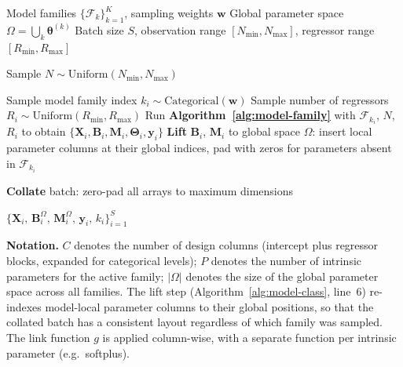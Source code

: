 \documentclass{article}
\begin{document}
\bigskip

\begin{algorithm}[H]
\caption{Model Class Meta-Simulator}
\label{alg:model-class}
\begin{algorithmic}[1]
\Require Model families $\{\mathcal{F}_k\}_{k=1}^{K}$, sampling weights $\mathbf{w}$
\Require Global parameter space $\Omega = \bigcup_k \boldsymbol{\theta}^{(k)}$
\Require Batch size $S$, observation range $[N_{\min}, N_{\max}]$, regressor range $[R_{\min}, R_{\max}]$

\State Sample $N \sim \mathrm{Uniform}(N_{\min}, N_{\max})$

    \State Sample model family index $k_i \sim \mathrm{Categorical}(\mathbf{w})$
    \State Sample number of regressors $R_i \sim \mathrm{Uniform}(R_{\min}, R_{\max})$
    \State Run \textbf{Algorithm~\ref{alg:model-family}} with $\mathcal{F}_{k_i}$, $N$, $R_i$
        to obtain $\{\mathbf{X}_i, \mathbf{B}_i, \mathbf{M}_i, \boldsymbol{\Theta}_i, \mathbf{y}_i\}$
    \State \textbf{Lift} $\mathbf{B}_i$, $\mathbf{M}_i$ to global space $\Omega$:
        insert local parameter columns at their global indices,
        pad with zeros for parameters absent in $\mathcal{F}_{k_i}$
\EndFor

\State \textbf{Collate} batch: zero-pad all arrays to maximum dimensions

\State \Return $\bigl\{\mathbf{X}_i,\, \mathbf{B}_i^{\Omega},\, \mathbf{M}_i^{\Omega},\, \mathbf{y}_i,\, k_i\bigr\}_{i=1}^{S}$
\end{algorithmic}
\end{algorithm}

\bigskip
\noindent\textbf{Notation.}
$C$ denotes the number of design columns (intercept plus regressor blocks,
expanded for categorical levels); $P$ denotes the number of intrinsic
parameters for the active family; $|\Omega|$ denotes the size of the global
parameter space across all families.
The lift step (Algorithm~\ref{alg:model-class}, line~6) re-indexes
model-local parameter columns to their global positions, so that the collated
batch has a consistent layout regardless of which family was sampled.
The link function $g$ is applied column-wise, with a separate function per
intrinsic parameter (e.g.\ softplus).
\end{document}
